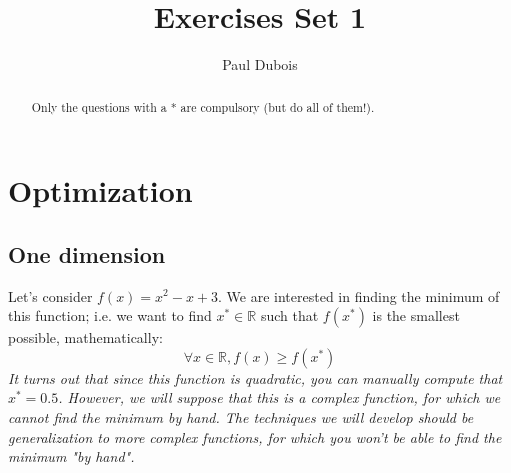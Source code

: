 \documentclass[]{article}
\title{Exercises Set 1}
\author{Paul Dubois}
\newcommand{\R}{\mathbb{R}}
\begin{document}
	
	\maketitle
	
	\begin{abstract}
		Only the questions with a * are compulsory (but do all of them!).
	\end{abstract}
	
	\section{Optimization}
	\subsection{One dimension}
	Let's consider $f(x) = x^2-x+3$.
	We are interested in finding the minimum of this function; 
	i.e. we want to find $x^* \in \R$ such that $f(x^*)$ is the smallest possible, mathematically:
	$$\forall x\in \R, f(x) \geq f(x^*)$$
	\textit{It turns out that since this function is quadratic, you can manually compute that $x^*=0.5$.
		However, we will suppose that this is a complex function, for which we cannot find the minimum by hand.
		The techniques we will develop should be generalization to more complex functions, for which you won't be able to find the minimum "by hand".}
	
	
	
	
	
\end{document}
